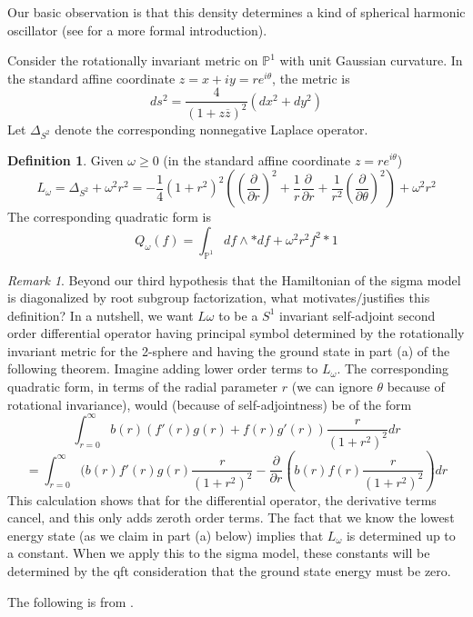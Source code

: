 \documentclass{amsart}
\theoremstyle{conjecture}
\theoremstyle{definition}
\newtheorem{definition}{Definition}
\theoremstyle{question}
\theoremstyle{questions}
\theoremstyle{remark}
\newtheorem*{remark}{Remark}
\theoremstyle{remarks}
\theoremstyle{example}
\numberwithin{equation}{section}
\begin{document}
Our basic observation is that this density determines a kind of spherical harmonic oscillator (see \cite{HP} for a more formal introduction).

Consider the rotationally invariant metric on $\mathbb P^1$ with unit Gaussian curvature. In the standard affine coordinate $z=x+iy=re^{i\theta}$, the metric is
$$ds^2=\frac{4}{(1+z\overline z)^2}(dx^2+dy^2)$$
Let $\Delta_{S^2}$ denote the corresponding nonnegative Laplace operator.

\begin{definition} \label{sphosc}Given $\omega\ge 0$ (in the standard affine coordinate $z=re^{i\theta}$)
$$L_{\omega}=\Delta_{S^2}+\omega^2 r^2=-\frac 14(1+r^2)^2\left((\frac{\partial}{\partial r})^2+\frac 1 r\frac{\partial}{\partial r}+\frac{1}{r^2}(\frac{\partial}{\partial \theta})^2\right)+\omega^2r^2$$
The corresponding quadratic form is
$$Q_{\omega}(f)=\int_{\mathbb P^1}df\wedge*df+\omega^2r^2f^2 *1$$
\end{definition}

\begin{remark}\label{sphosc2} Beyond our third hypothesis that the Hamiltonian of the sigma model is diagonalized by root subgroup factorization, what motivates/justifies this definition? In a nutshell, we want $L{\omega}$ to be a $S^1$ invariant self-adjoint second order
differential operator having principal symbol determined by the rotationally invariant metric for the 2-sphere
and having the ground state in part (a) of the following theorem. Imagine adding lower order terms to $L_{\omega}$. The corresponding quadratic form, in terms of the radial parameter $r$ (we can ignore $\theta$ because of rotational invariance), would (because of self-adjointness) be of the form
$$\int_{r=0}^{\infty} b(r)(f'(r)g(r)+f(r)g'(r))\frac{r}{(1+r^2)^2} dr$$
$$=\int_{r=0}^{\infty} (b(r)f'(r)g(r)\frac{r}{(1+r^2)^2}-\frac{\partial }{\partial r}(b(r)f(r)\frac{r}{(1+r^2)^2}) dr$$
This calculation shows that for the differential operator, the derivative terms cancel, and this only adds zeroth order terms. The fact that we know the lowest energy state (as we claim in part (a) below) implies that
$L_{\omega}$ is determined up to a constant. When we apply this to the sigma model, these constants will be determined by the qft consideration that the ground state energy must be zero.

\end{remark}

The following is from \cite{HP}.
\end{document}
